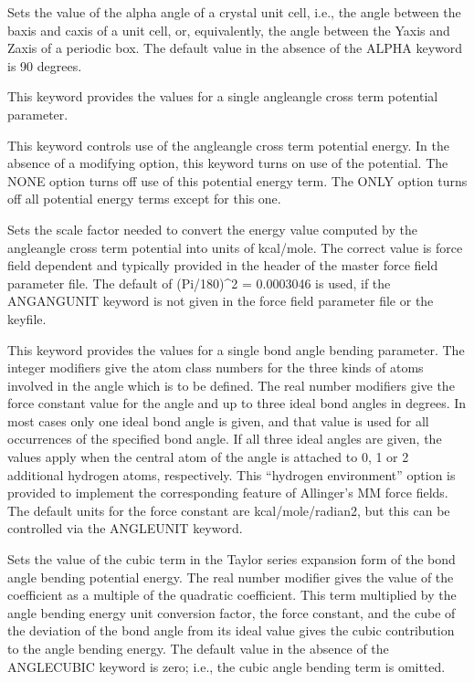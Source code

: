 \documentclass[letterpaper,11pt,english]{sphinxmanual}
\begin{document}
  Sets the value of the alpha angle of a crystal unit cell, i.e., the angle between the b\sphinxhyphen{}axis and c\sphinxhyphen{}axis of a unit cell, or, equivalently, the angle between the Y\sphinxhyphen{}axis and Z\sphinxhyphen{}axis of a periodic box. The default value in the absence of the ALPHA keyword is 90 degrees.

  This keyword provides the values for a single angle\sphinxhyphen{}angle cross term potential parameter.

  This keyword controls use of the angle\sphinxhyphen{}angle cross term potential energy. In the absence of a modifying option, this keyword turns on use of the potential. The NONE option turns off use of this potential energy term. The ONLY option turns off all potential energy terms except for this one.

  Sets the scale factor needed to convert the energy value computed by the angle\sphinxhyphen{}angle cross term potential into units of kcal/mole. The correct value is force field dependent and typically provided in the header of the master force field parameter file. The default of (Pi/180)\textasciicircum{}2 = 0.0003046 is used, if the ANGANGUNIT keyword is not given in the force field parameter file or the keyfile.

  This keyword provides the values for a single bond angle bending parameter. The integer modifiers give the atom class numbers for the three kinds of atoms involved in the angle which is to be defined. The real number modifiers give the force constant value for the angle and up to three ideal bond angles in degrees. In most cases only one ideal bond angle is given, and that value is used for all occurrences of the specified bond angle. If all three ideal angles are given, the values apply when the central atom of the angle is attached to 0, 1 or 2 additional hydrogen atoms, respectively. This “hydrogen environment” option is provided to implement the corresponding feature of Allinger’s MM force fields. The default units for the force constant are kcal/mole/radian2, but this can be controlled via the ANGLEUNIT keyword.

  Sets the value of the cubic term in the Taylor series expansion form of the bond angle bending potential energy. The real number modifier gives the value of the coefficient as a multiple of the quadratic coefficient. This term multiplied by the angle bending energy unit conversion factor, the force constant, and the cube of the deviation of the bond angle from its ideal value gives the cubic contribution to the angle bending energy. The default value in the absence of the ANGLE\sphinxhyphen{}CUBIC keyword is zero; i.e., the cubic angle bending term is omitted.
\end{document}
